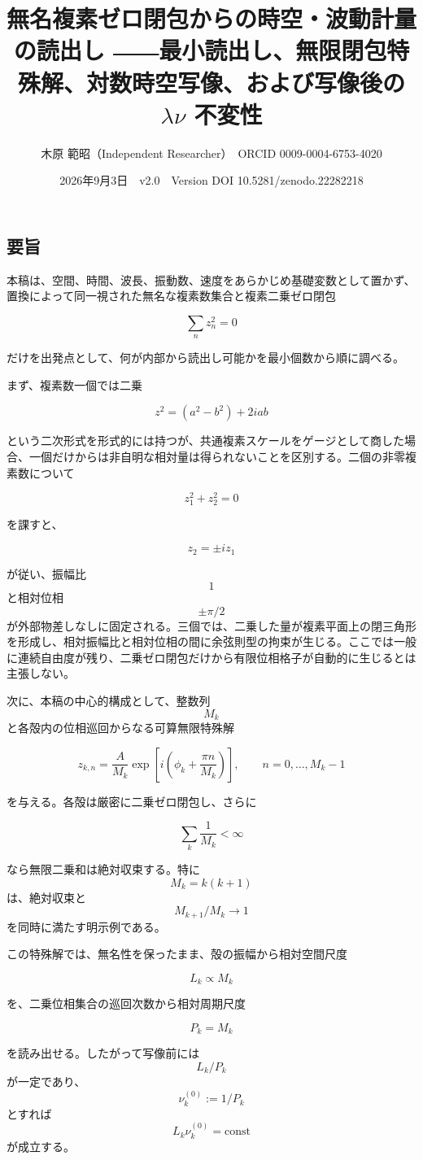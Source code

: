 \documentclass[
  a4paper,
]{ltjsarticle}
\title{無名複素ゼロ閉包からの時空・波動計量の読出し
――最小読出し、無限閉包特殊解、対数時空写像、および写像後の
\(\lambda\nu\) 不変性}
\author{木原 範昭（Independent Researcher）　ORCID 0009-0004-6753-4020}
\date{2026年9月3日　v2.0　Version DOI 10.5281/zenodo.22282218}
\begin{document}
\maketitle

\subsection{要旨}\label{ux8981ux65e8}

本稿は、空間、時間、波長、振動数、速度をあらかじめ基礎変数として置かず、置換によって同一視された無名な複素数集合と複素二乗ゼロ閉包

\[
\sum_n z_n^2=0
\]

だけを出発点として、何が内部から読出し可能かを最小個数から順に調べる。

まず、複素数一個では二乗

\[
z^2=(a^2-b^2)+2iab
\]

という二次形式を形式的には持つが、共通複素スケールをゲージとして商した場合、一個だけからは非自明な相対量は得られないことを区別する。二個の非零複素数について

\[
z_1^2+z_2^2=0
\]

を課すと、

\[
z_2=\pm i z_1
\]

が従い、振幅比 \[1\] と相対位相 \[\pm\pi/2\]
が外部物差しなしに固定される。三個では、二乗した量が複素平面上の閉三角形を形成し、相対振幅比と相対位相の間に余弦則型の拘束が生じる。ここでは一般に連続自由度が残り、二乗ゼロ閉包だけから有限位相格子が自動的に生じるとは主張しない。

次に、本稿の中心的構成として、整数列 \[M_k\]
と各殻内の位相巡回からなる可算無限特殊解

\[
z_{k,n}
=
\frac{A}{M_k}
\exp\left[i\left(\phi_k+\frac{\pi n}{M_k}\right)\right],
\qquad
n=0,\ldots,M_k-1
\]

を与える。各殻は厳密に二乗ゼロ閉包し、さらに

\[
\sum_k \frac{1}{M_k}<\infty
\]

なら無限二乗和は絶対収束する。特に \[M_k=k(k+1)\] は、絶対収束と
\[M_{k+1}/M_k\to1\] を同時に満たす明示例である。

この特殊解では、無名性を保ったまま、殻の振幅から相対空間尺度

\[
L_k\propto M_k
\]

を、二乗位相集合の巡回次数から相対周期尺度

\[
P_k=M_k
\]

を読み出せる。したがって写像前には \[L_k/P_k\]
が一定であり、\[\nu_k^{(0)}:=1/P_k\] とすれば
\[L_k\nu_k^{(0)}=\mathrm{const}\] が成立する。
\end{document}
